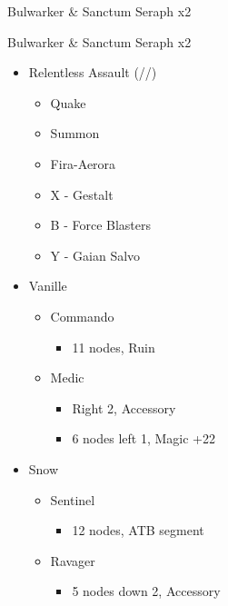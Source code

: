 \begin{paracol}{2}
\begin{battle}{Bulwarker \& Sanctum Seraph x2}
\end{battle}
\switchcolumn
\begin{battle}{Bulwarker \& Sanctum Seraph x2}
	\begin{itemize}
		\item [2] Relentless Assault (\rav/\rav/\com)
		      \begin{itemize}
			      \item Quake
			      \item Summon
			      \item Fira-Aerora
			      \item X - Gestalt
			      \item B - Force Blasters
			      \item Y - Gaian Salvo
		      \end{itemize}
	\end{itemize}
\end{battle}
\switchcolumn*
\begin{menu}
	\begin{itemize}
		\crystarium
		\begin{itemize}
			\item Vanille
			      \begin{itemize}
				      \item Commando
				            \begin{itemize}
					            \item 11 nodes, Ruin
				            \end{itemize}
				      \item Medic
				            \begin{itemize}
					            \item Right 2, Accessory
					            \item 6 nodes left 1, Magic +22
				            \end{itemize}
			      \end{itemize}
			\item Snow
			      \begin{itemize}
				      \item Sentinel
				            \begin{itemize}
					            \item 12 nodes, ATB segment
				            \end{itemize}
				      \item Ravager
				            \begin{itemize}
					            \item 5 nodes down 2, Accessory

\end{itemize}
\end{itemize}
\end{itemize}
\end{itemize}
\end{menu}
\end{paracol}
